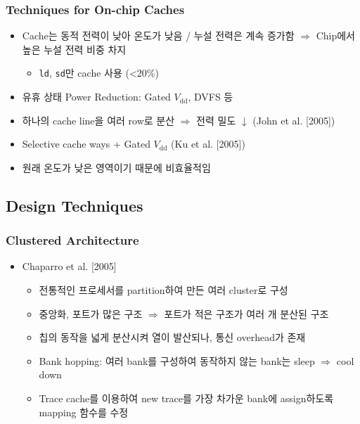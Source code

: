 \subsubsection*{Techniques for On-chip Caches}
\begin{itemize}
    \item Cache는 동적 전력이 낮아 온도가 낮음 / 누설 전력은 계속 증가함 $\Rightarrow$ Chip에서 높은 누설 전력 비중 차지
    \begin{itemize}
        \item \texttt{ld}, \texttt{sd}만 cache 사용 (\textless 20\%)
    \end{itemize}
    \item 유휴 상태 Power Reduction: Gated $V_{\mathrm{dd}}$, DVFS 등
    \item 하나의 cache line을 여러 row로 분산 $\Rightarrow$ 전력 밀도 $\downarrow$ (John et al. [2005])
    \item Selective cache ways + Gated $V_{\mathrm{dd}}$ (Ku et al. [2005])
    \item 원래 온도가 낮은 영역이기 때문에 비효율적임
\end{itemize}

\subsection{Design Techniques}

\subsubsection*{Clustered Architecture}
\begin{itemize}
    \item Chaparro et al. [2005]
    \begin{itemize}
        \item 전통적인 프로세서를 partition하여 만든 여러 cluster로 구성
        \item 중앙화, 포트가 많은 구조 $\Rightarrow$ 포트가 적은 구조가 여러 개 분산된 구조
        \item 칩의 동작을 넓게 분산시켜 열이 발산되나, 통신 overhead가 존재
        \item Bank hopping: 여러 bank를 구성하여 동작하지 않는 bank는 sleep $\Rightarrow$ cool down
        \item Trace cache를 이용하여 new trace를 가장 차가운 bank에 assign하도록 mapping 함수를 수정
    \end{itemize}
\end{itemize}

